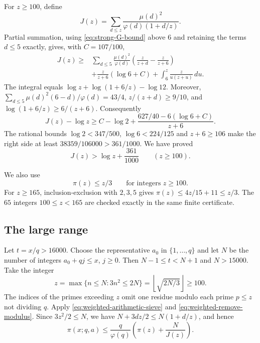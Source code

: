 For $z\geq100$, define
\[
 J(z)=\sum_{d\leq z}\frac{\mu(d)^2}{\varphi(d)(1+d/z)}.
\]
Partial summation, using \eqref{eq:strong-G-bound} above $6$ and
retaining the terms $d\leq5$ exactly, gives, with $C=107/100$,
\begin{align*}
 J(z)\geq{}&
 \sum_{d\leq5}\frac{\mu(d)^2}{\varphi(d)}
              \left(\frac z{z+d}-\frac z{z+6}\right)\\
 &+\frac z{z+6}(\log6+C)
   +\int_6^z\frac z{u(z+u)}\,du.
\end{align*}
The integral equals
$\log z+\log(1+6/z)-\log12$.
Moreover,
$\sum_{d\leq5}\mu(d)^2(6-d)/\varphi(d)=43/4$,
$z/(z+d)\geq9/10$, and
$\log(1+6/z)\geq6/(z+6)$.
Consequently
\[
 J(z)-\log z\geq C-\log2+
             \frac{627/40-6(\log6+C)}{z+6}.
\]
The rational bounds $\log2<347/500$, $\log6<224/125$ and
$z+6\geq106$ make the right side at least
$38359/106000>361/1000$.  We have proved
\begin{equation}
 J(z)>\log z+\frac{361}{1000}\qquad(z\geq100).
 \label{eq:weighted-J-bound}
\end{equation}

We also use
\begin{equation}
 \pi(z)\leq z/3\qquad\text{for integers }z\geq100.
 \label{eq:weak-prime-count}
\end{equation}
For $z\geq165$, inclusion-exclusion with $2,3,5$ gives
$\pi(z)\leq4z/15+11\leq z/3$.
The $65$ integers $100\leq z<165$ are checked exactly in the
same finite certificate.

\subsection{The large range}

Let $t=x/q>16000$.  Choose the representative $a_0$ in
$\{1,\ldots,q\}$ and let $N$ be the number of integers
$a_0+qj\leq x$, $j\geq0$.  Then
$N-1\leq t<N+1$ and $N>15000$.
Take the integer
\[
 z=\max\{n\leq N:3n^2\leq2N\}
   =\left\lfloor\sqrt{2N/3}\right\rfloor\geq100.
\]
The indices of the primes exceeding $z$ omit one residue modulo
each prime $p\leq z$ not dividing $q$.  Apply
\eqref{eq:weighted-arithmetic-sieve} and
\eqref{eq:weighted-remove-modulus}.  Since
$3z^2/2\leq N$, we have
$N+3dz/2\leq N(1+d/z)$, and hence
\begin{equation}
 \pi(x;q,a)\leq\frac q{\varphi(q)}
                \left(\pi(z)+\frac N{J(z)}\right).
 \label{eq:large-range-sieve}
\end{equation}

